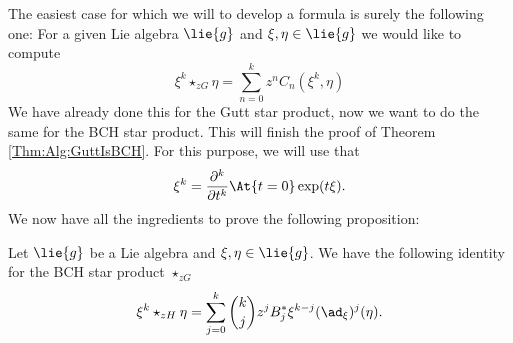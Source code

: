 The easiest case for which we will to develop a formula is surely the 
following one: For a given Lie algebra $\lie{g}$ and $\xi, \eta \in 
\lie{g}$ we would like to compute
\begin{equation*}
    \xi^k \star_{zG} \eta
    =
    \sum\limits_{n=0}^k
    z^n C_n(\xi^k, \eta)
\end{equation*}
We have already done this for the Gutt star product, now we 
want to do the same for the BCH star product. This will finish
the proof of Theorem \ref{Thm:Alg:GuttIsBCH}. For this purpose, 
we will use that
\begin{equation}\label{Formulas:MonomialDerivative}
    \xi^k
    =
    \frac{\partial^k}{\partial t^k}
    \At{t = 0} \exp(t \xi).
\end{equation}
We now have all the ingredients to prove the following proposition:
\begin{lemma}
    \label{Formulas:Lemma:LinearMonomial1}
    Let $\lie{g}$ be a Lie algebra and $\xi, \eta \in \lie{g}$. We
    have the following identity for the BCH star product $\star_{zG}$
    \begin{equation}
        \label{Formulas:LinearMonomial1}
        \xi^k \star_{zH} \eta
        =
        \sum\limits_{j=0}^k
        \binom{k}{j} z^j B_j^*
        \xi^{k-j}(\ad_{\xi})^j (\eta).
    \end{equation}
\end{lemma}
